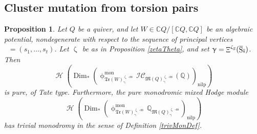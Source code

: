 \documentclass[a4paper,10pt]{amsart}
\newtheorem{proposition}[theorem]{Proposition}
\newcommand{\QQ}{\mathbb{Q}}
\DeclareMathOperator{\Simp}{S}
\newcommand{\WWW}{\mathfrak{Tr}(W)}
\newcommand{\Mst}{\mathfrak{M}}
\newcommand{\ICS}{\mathcal{IC}}
\newcommand{\phim}[1]{\phi^{\mon}_{#1}}
\newcommand{\shave}{\overline{\Simp}_{\Ss}}
\renewcommand{\gamma}{\upgamma}
\renewcommand{\zeta}{\upzeta}
\renewcommand{\phi}{\upphi}
\DeclareMathOperator{\sst}{-ss}
\DeclareMathOperator{\nilp}{nilp}
\DeclareMathOperator{\Dim}{Dim}
\DeclareMathOperator{\mon}{mon}
\DeclareMathOperator{\Mu}{\Upxi}
\DeclareMathOperator{\Ss}{\overline{s}}
\DeclareMathOperator{\Ho}{\mathcal{H}}
\begin{document}
\subsection{Cluster mutation from torsion pairs}

\begin{proposition}
\label{TPure}
Let $Q$ be a quiver, and let $W\in\mathbb{C}Q/[\mathbb{C}Q,\mathbb{C}Q]$ be an algebraic potential, nondegenerate with respect to the sequence of principal vertices $\Ss=(s_1,\ldots, s_t)$.  Let $\zeta_{\Ss}$ be as in Proposition \ref{zetaTheta}, and set $\gamma=\Mu^{\zeta_{\Ss}}(\shave)$.  Then
\begin{equation}
\Ho\left(\Dim_* \left(\phim{\WWW^{\zeta_{\Ss}\sst}_{\gamma}}\ICS_{\Mst(Q)_{\gamma}^{\zeta_{\Ss}\sst}}(\mathbb{Q})\right)_{\nilp}\right)
\end{equation}
is pure, of Tate type.  Furthermore, the pure monodromic mixed Hodge module
\begin{equation}
\label{secondOne}
\Ho\left(\Dim_* \left(\phim{\WWW^{\zeta_{\Ss}\sst}_{\gamma}}\QQ_{\Mst(Q)_{\gamma}^{\zeta_{\Ss}\sst}}\right)_{\nilp}\right)
\end{equation}
has trivial monodromy in the sense of Definition \ref{trivMonDef}.
\end{proposition}
\end{document}
